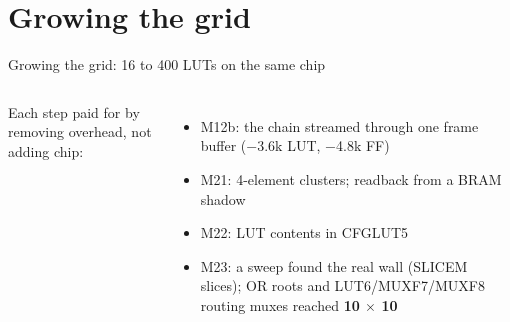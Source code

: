 \documentclass[aspectratio=169,11pt]{beamer}
\begin{document}
\section{Growing the grid}
\begin{frame}{Growing the grid: 16 to 400 LUTs on the same chip}
  \begin{columns}[c]
    \centering
    \small
    Each step paid for by removing overhead, not adding chip:
    \begin{itemize}
      \item M12b: the chain streamed through one frame buffer ($-$3.6k LUT, $-$4.8k FF)
      \item M21: 4-element clusters; readback from a BRAM shadow
      \item M22: LUT contents in CFGLUT5
      \item M23: a sweep found the real wall (\alert{SLICEM} slices); OR roots and LUT6/MUXF7/MUXF8 routing muxes reached \textbf{10 $\times$ 10}
    \end{itemize}
  \end{columns}
\end{frame}

\end{document}
